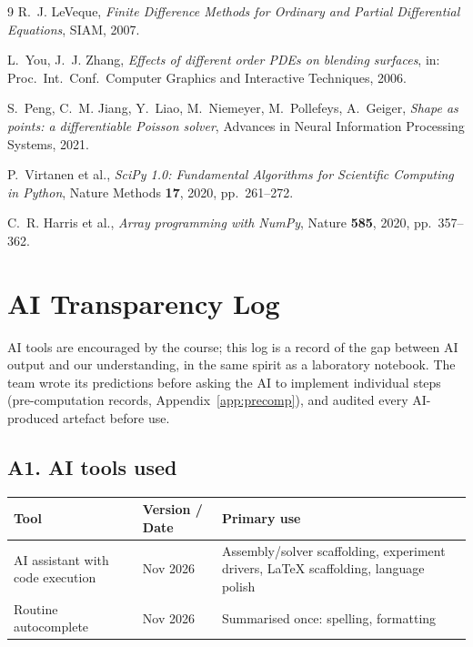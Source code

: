 \documentclass[11pt,a4paper]{article}
\begin{document}
\begin{thebibliography}{9}
R.~J. LeVeque,
\emph{Finite Difference Methods for Ordinary and Partial Differential
Equations}, SIAM, 2007.

L.~You, J.~J. Zhang,
\textit{Effects of different order PDEs on blending surfaces},
in: Proc.\ Int.\ Conf.\ Computer Graphics and Interactive Techniques, 2006.

S.~Peng, C.~M. Jiang, Y.~Liao, M.~Niemeyer, M.~Pollefeys, A.~Geiger,
\textit{Shape as points: a differentiable Poisson solver},
Advances in Neural Information Processing Systems, 2021.

P.~Virtanen et al.,
\textit{SciPy 1.0: Fundamental Algorithms for Scientific Computing in
Python}, Nature Methods \textbf{17}, 2020, pp.~261--272.

C.~R. Harris et al.,
\textit{Array programming with NumPy}, Nature \textbf{585}, 2020,
pp.~357--362.
\end{thebibliography}

\appendix
{}
\section{AI Transparency Log}
\label{app:ai}

AI tools are encouraged by the course; this log is a record of the gap
between AI output and our understanding, in the same spirit as a laboratory
notebook. The team wrote its predictions before asking the AI to implement
individual steps (pre-computation records, Appendix~\ref{app:precomp}), and
audited every AI-produced artefact before use.

\subsection*{A1. AI tools used}
\begin{table}[h]
\centering
\small
\begin{tabular}{@{}p{3.5cm}p{4.5cm}p{3.5cm}@{}}
\toprule
Tool & Version / Date & Primary use \\
\midrule
AI assistant with code execution & Nov 2026 & Assembly/solver scaffolding,
experiment drivers, \LaTeX{} scaffolding, language polish \\
Routine autocomplete & Nov 2026 & Summarised once: spelling, formatting \\
\bottomrule
\end{tabular}
\end{table}
\end{document}
